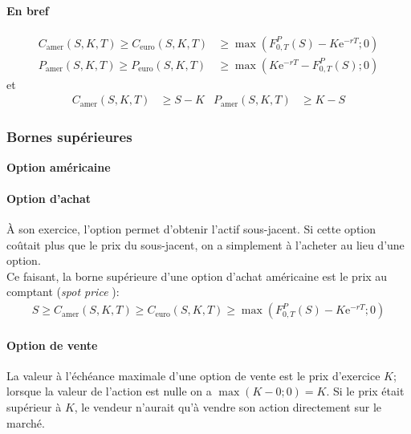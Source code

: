\documentclass[10pt, french]{article}
\begin{document}
\begin{multicols*}{2}
\paragraph{En bref}
\begin{rappel_enhanced}
\begin{align*}
	C_{\text{amer}}(S, K, T)	\geq
	C_{\text{euro}}(S, K, T)	
	&\geq	\max\left(F_{0, T}^{P}(S) - K\textrm{e}^{-rT}; 0\right)	\\
	P_{\text{amer}}(S, K, T)	\geq
	P_{\text{euro}}(S, K, T)	
	&\geq	\max\left(K\textrm{e}^{-rT} - F_{0, T}^{P}(S); 0\right)
\end{align*}
et
\begin{align*}
	C_{\text{amer}}(S, K, T)	
	&\geq	S - K	&
	P_{\text{amer}}(S, K, T)
	&\geq	K - S
\end{align*}
\end{rappel_enhanced}

\subsubsection*{Bornes supérieures}
\begin{center}
	\textbf{Option américaine}
\end{center}

\paragraph{Option d'achat}
À son exercice, l'option permet d'obtenir l'actif sous-jacent. Si cette option coûtait plus que le prix du sous-jacent, on a simplement à l'acheter au lieu d'une option.\\

Ce faisant, \textcolor{cobalt}{la borne supérieure d'une option d'achat américaine est le prix au comptant (\og \textit{spot price} \fg{})}:
\begin{align*}
	S	
	\geq	C_{\text{amer}}(S, K, T)
	\geq	C_{\text{euro}}(S, K, T)
	\geq	\max\left(F_{0, T}^{P}(S) - K\textrm{e}^{-rT}; 0\right)
\end{align*}

\paragraph{Option de vente}
La valeur à l'échéance maximale d'une option de vente est le prix d'exercice $K$; lorsque la valeur de l'action est nulle on a $\max(K - 0; 0) = K$. Si le prix était supérieur à $K$, le vendeur n'aurait qu'à vendre son action directement sur le marché. \\


\end{multicols*}
\end{document}

